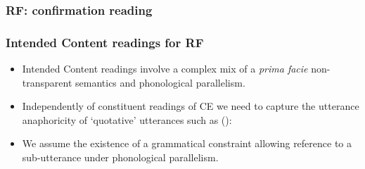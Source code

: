 \documentclass{beamer}
\newcommand{\bit}{\begin{itemize}}
\newcommand{\eit}{\end{itemize}}
\begin{document}
\begin{frame}\frametitle{RF: confirmation reading}


{\scriptsize {}


}

\end{frame}





\begin{frame}\frametitle{Intended Content readings for RF}

\bit
\item
Intended Content readings involve a complex mix of a {\it prima facie} non-transparent semantics and
phonological parallelism.



\item 
Independently of constituent readings of CE we need to capture the
utterance anaphoricity of `quotative' utterances such as ():


\item
We assume the existence of a grammatical constraint allowing reference
to a sub-utterance under phonological parallelism. 

\eit\end{frame}
\end{document}
